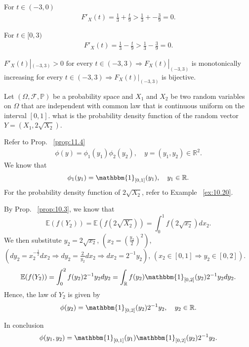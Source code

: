 \begin{exercise}[]
\begin{enumerate}[label=(\alph*), start=2]
            For $t \in (-3, 0) $
            \begin{align*}
                F'_X(t) = \frac{1}{3} + \frac{t}{9} > \frac{1}{3} + -\frac{3}{9} = 0
            .\end{align*}

            For $t \in [0, 3) $
            \begin{align*}
                F'_X(t) = \frac{1}{3} - \frac{t}{9} > \frac{1}{3} - \frac{3}{9} = 0
            .\end{align*}

            $F'_X(t)|_{(-3,3)} > 0 \text{ for every } t \in (-3, 3) \Rightarrow F_X(t)|_{(-3,3)}$
            is monotonically increasing for every $t \in (-3, 3) \Rightarrow F_X(t)|_{(-3,3)}$
            is bijective.

    \end{enumerate}
\end{exercise}

\begin{exercise}[]
    \label{ex:12.4}
    Let $(\Omega, \mathcal{F}, \mathbb{P})$ be a probability space and $X_1 $ and $X_2 $ be two
    random variables on $\Omega$ that are independent with common law that is continuous uniform
    on the interval $\left[ 0,1 \right]  $. what is the probability density function of the
    random vector $Y=(X_1, 2\sqrt{X_2} ) $.

    Refer to Prop. ~\ref{prop:11.4}
    \begin{align*}
      \phi(y) = \phi_1(y_1)\phi_2(y_2), \quad y = (y_1, y_2) \in \mathbb{R}^{2}
    .\end{align*}
    We know that 
    \begin{align*}
      \phi_1(y_1)= \mathbbm{1}_{[0,1]}(y_1), \quad y_1 \in \mathbb{R} 
    .\end{align*}
    For the probability density function of $2\sqrt{X_2}  $, refer to Example ~\ref{ex:10.20}.
    
    By Prop. ~\ref{prop:10.3}, we know that 
    \[
      \mathbb{E}(f(Y_2)) = \mathbb{E}(f(2\sqrt{X_2} )) = \int_{0}^{1} f(2\sqrt{x_2})dx_2.
    \] 
    We then substitute $y_2 = 2\sqrt{x_2} $,  $\left( x_2 = \left( \frac{y_2}{2} \right)^2  \right)$,
    $\left( dy_2 = x_2^{-\frac{1}{2}} dx_2 \Rightarrow dy_2 = \frac{2}{y_2}dx_2 \Rightarrow dx_2 = 2^{-1}y_2\right)  $,
    $\left( x_2 \in \left[ 0,1 \right] \Rightarrow y_2 \in \left[ 0,2 \right]  \right)  $.
    \[
    \mathbb{E}(f(Y_2)) = \int_{0}^{2} f(y_2)2^{-1}y_2dy_2 = \int_{\mathbb{R}} f(y_2)\mathbbm{1}_{[0,2]}(y_2)2^{-1}y_2dy_2
    .\] 
    Hence, the law of $Y_2 $ is given by
    \[
    \phi(y_2) = \mathbbm{1}_{[0,2]}(y_2)2^{-1}y_2, \quad y_2 \in \mathbb{R}
    .\] 

    In conclusion
    \[
      \phi(y_1, y_2) = \mathbbm{1}_{\left[ 0,1 \right] }(y_1) \mathbbm{1}_{\left[ 0,2 \right] }(y_2) 2^{-1}y_2 
    .\] 



\end{exercise}

